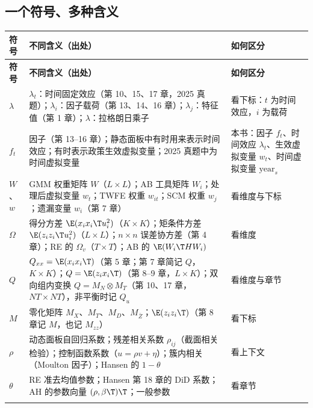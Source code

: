 \subsection{一个符号、多种含义}

{\renewcommand{\arraystretch}{1.15}\begin{longtable}{@{}>{\raggedright\arraybackslash\small}p{1.3cm}>{\raggedright\arraybackslash\small}p{10.0cm}>{\raggedright\arraybackslash\small}p{3.8cm}@{}}
\toprule
\textbf{符号} & \textbf{不同含义（出处）} & \textbf{如何区分}\\
\midrule
\endfirsthead
\toprule
\textbf{符号} & \textbf{不同含义（出处）} & \textbf{如何区分}\\
\midrule
\endhead
\bottomrule
\endlastfoot
$\lambda$ & $\lambda_t$：时间固定效应（第 10、15、17 章，2025 真题）；$\lambda_i$：因子载荷（第 13、14、16 章）；$\lambda_j$：特征值（第 1 章）；$\lambda$：拉格朗日乘子 & 看下标：$t$ 为时间效应，$i$ 为载荷\\
\addlinespace[1pt]
$f_t$ & 因子（第 13–16 章）；静态面板中有时用来表示时间效应；有时表示政策生效虚拟变量；2025 真题中为时间虚拟变量 & 本书：因子 $f_t$、时间效应 $\lambda_t$、生效虚拟变量 $w_t$、时间虚拟变量 $\text{year}_s$\\
\addlinespace[1pt]
$W$、$w$ & GMM 权重矩阵 $W$（$L\times L$）；AB 工具矩阵 $W_i$；处理后虚拟变量 $w_t$；TWFE 权重 $w_{it}$；SCM 权重 $w_j$；遗漏变量 $w_i$（第 7 章） & 看维度与下标\\
\addlinespace[1pt]
$\Omega$ & 得分方差 $\E(x_ix_i\T u_i^2)$（$K\times K$）；矩条件方差 $\E(z_iz_i\T u_i^2)$（$L\times L$）；$n\times n$ 误差协方差（第 4 章）；RE 的 $\Omega_v$（$T\times T$）；AB 的 $\E(W_i\T HW_i)$ & 看维度\\
\addlinespace[1pt]
$Q$ & $Q_{xx}=\E(x_ix_i\T)$（第 5 章；第 7 章简记 $Q$，$K\times K$）；$Q=\E(z_ix_i\T)$（第 8–9 章，$L\times K$）；双向组内变换 $Q=M_N\otimes M_T$（第 10、17 章，$NT\times NT$），非平衡时记 $Q_u$ & 看维度与章节\\
\addlinespace[1pt]
$M$ & 零化矩阵 $M_X$、$M_T$、$M_D$、$M_{\bar Z}$；$\E(z_iz_i\T)$（第 8 章记 $M$，也记 $M_{zz}$） & 看下标\\
\addlinespace[1pt]
$\rho$ & 动态面板自回归系数；残差相关系数 $\rho_{ij}$（截面相关检验）；控制函数系数（$u=\rho v+\eta$）；簇内相关（Moulton 因子）；Hansen 的 $1-\theta$ & 看上下文\\
\addlinespace[1pt]
$\theta$ & RE 准去均值参数；Hansen 第 18 章的 DiD 系数；AH 的参数向量 $(\rho,\beta\T)\T$；一般参数 & 看章节\\
\addlinespace[1pt]

\end{longtable}}

